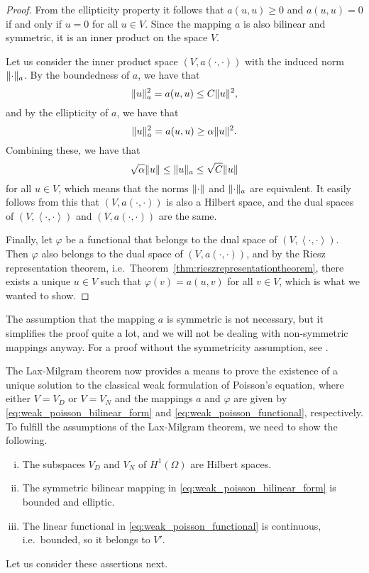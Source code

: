\documentclass[english, 12pt, a4paper, sci, utf8, a-2b, online]{aaltothesis}
\theoremstyle{definition}
\theoremstyle{plain}
\DeclarePairedDelimiter\norm{\lVert}{\rVert}
\newcommand*{\innerprod}[2]{\left\langle #1, #2 \right\rangle}
\numberwithin{equation}{section}
\begin{document}
\begin{proof}
    From the ellipticity property it follows that $a(u,u) \geq 0$ and
    $a(u,u) = 0$ if and only if $u=0$ for all $u \in V$.
    Since the mapping $a$ is also bilinear and symmetric, it is
    an inner product on the space $V$.
    
    Let us consider the inner product space $(V, a(\cdot,\cdot))$
    with the induced norm $\norm{\cdot}_a$.
    By the boundedness of $a$, we have that
    \begin{equation*}
        \norm{u}_a^2
        = a(u,u)
        \leq C \norm{u}^2,
    \end{equation*}
    and by the ellipticity of $a$, we have that
    \begin{equation*}
        \norm{u}_a^2
        = a(u,u)
        \geq \alpha \norm{u}^2.
    \end{equation*}
    Combining these, we have that
    \begin{equation*}
        \sqrt{\alpha} \norm{u} \leq \norm{u}_a \leq \sqrt{C} \norm{u}
    \end{equation*}
    for all $u \in V$,
    which means that the norms $\norm{\cdot}$ and $\norm{\cdot}_a$
    are equivalent. It easily follows from this that $(V, a(\cdot,\cdot))$
    is also a Hilbert space, and the dual spaces of
    $(V,\innerprod{\cdot}{\cdot})$ and
    $(V, a(\cdot,\cdot))$ are the same.

    Finally, let $\varphi$ be a functional that belongs to the dual space
    of $(V,\innerprod{\cdot}{\cdot})$. Then $\varphi$ also belongs
    to the dual space of $(V, a(\cdot,\cdot))$,
    and by the Riesz representation theorem, i.e.\
    Theorem~\ref{thm:rieszrepresentationtheorem}, there exists a unique
    $u \in V$ such that $\varphi(v) = a(u,v)$ for all $v \in V$,
    which is what we wanted to show.
\end{proof}
The assumption that the mapping $a$ is symmetric is not necessary, but it
simplifies the proof quite a lot, and we will not be dealing with non-symmetric
mappings anyway. For a proof without the symmetricity assumption,
see \cite[Theorem 1 on p. 297]{evans2010}.

The Lax-Milgram theorem now provides a means to prove the existence of
a unique solution to the classical weak formulation of Poisson's equation,
where either $V = V_D$ or $V = V_N$ and the mappings $a$ and $\varphi$ are given by
\eqref{eq:weak_poisson_bilinear_form} and \eqref{eq:weak_poisson_functional},
respectively. To fulfill the assumptions of the Lax-Milgram theorem,
we need to show the following.
\begin{enumerate}[(i)]
    \item The subspaces $V_D$ and $V_N$ of $H^1(\Omega)$ are Hilbert spaces.
    \item The symmetric bilinear mapping in \eqref{eq:weak_poisson_bilinear_form}
    is bounded and elliptic.
    \item The linear functional in \eqref{eq:weak_poisson_functional}
    is continuous, i.e.\ bounded, so it belongs to $V'$.
\end{enumerate}
Let us consider these assertions next.
\end{document}

